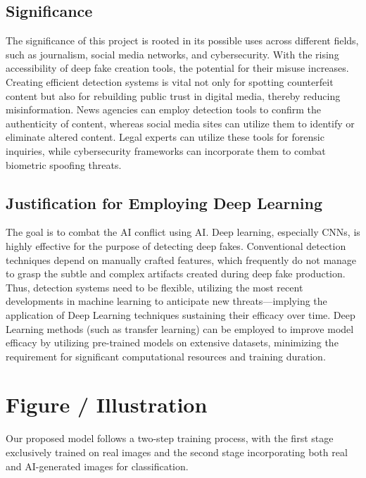 \documentclass{article} %
\begin{document}
\subsection{Significance}
The significance of this project is rooted in its possible uses across different fields, such as journalism, social media networks, and cybersecurity. With the rising accessibility of deep fake creation tools, the potential for their misuse increases. Creating efficient detection systems is vital not only for spotting counterfeit content but also for rebuilding public trust in digital media, thereby reducing misinformation. News agencies can employ detection tools to confirm the authenticity of content, whereas social media sites can utilize them to identify or eliminate altered content. Legal experts can utilize these tools for forensic inquiries, while cybersecurity frameworks can incorporate them to combat biometric spoofing threats.

\subsection{Justification for Employing Deep Learning}
The goal is to combat the AI conflict using AI. Deep learning, especially CNNs, is highly effective for the purpose of detecting deep fakes. Conventional detection techniques depend on manually crafted features, which frequently do not manage to grasp the subtle and complex artifacts created during deep fake production. Thus, detection systems need to be flexible, utilizing the most recent developments in machine learning to anticipate new threats—implying the application of Deep Learning techniques  sustaining their efficacy over time. Deep Learning methods (such as transfer learning) can be employed to improve model efficacy by utilizing pre-trained models on extensive datasets, minimizing the requirement for significant computational resources and training duration.

\section{Figure / Illustration}
\label{illustration}

Our proposed model follows a two-step training process, with the first stage exclusively trained on real images and the second stage incorporating both real and AI-generated images for classification.
\end{document}
